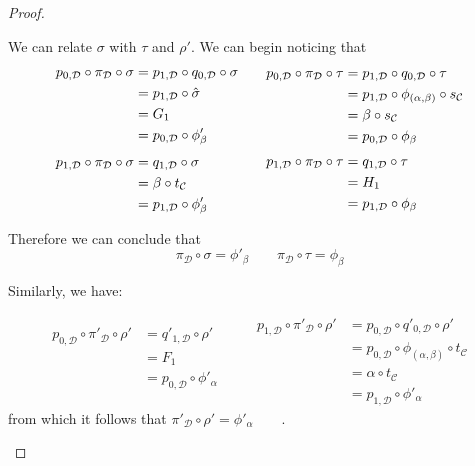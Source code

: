 \documentclass[a4paper,UKenglish,cleveref,pdftex,thm-restate,numberwithinsect]{lipics-v2021}
\begin{document}
\begin{proof}
\begin{enumerate}
We can relate $\sigma$ with $\tau$ and $\rho'$. We can begin noticing that
\[\begin{split}
	p_{0, \mathcal{D}}\circ \pi_{\mathcal{D}}\circ \sigma &= p_{1, \mathcal{D}}\circ q_{0, \mathcal{D}}\circ \sigma \\&=p_{1, \mathcal{D}} \circ \hat{\sigma}\\&=G_1	\\&=p_{0, \mathcal{D}}\circ  \phi'_{\beta} \\[.2\baselineskip] p_{1, \mathcal{D}}\circ \pi_{\mathcal{D}}\circ \sigma &=  q_{1, \mathcal{D}}\circ \sigma \\&=\beta \circ t_{\mathcal{C}}\\&=p_{1, \mathcal{D}}\circ  \phi'_{\beta} 
\end{split} \qquad\begin{split}
	p_{0, \mathcal{D}}\circ \pi_{\mathcal{D}}\circ \tau &= p_{1, \mathcal{D}}\circ q_{0, \mathcal{D}}\circ \tau \\&=p_{1, \mathcal{D}} \circ \phi_{(\alpha, \beta)} \circ s_{\mathcal{C}}\\&=\beta	\circ s_{\mathcal{C}} \\&=p_{0, \mathcal{D}} \circ \phi_{\beta}  \\[.2\baselineskip] 	p_{1, \mathcal{D}}\circ \pi_{\mathcal{D}}\circ \tau &=  q_{1, \mathcal{D}}\circ \tau \\&=H_1 \\&=p_{1, \mathcal{D}} \circ \phi_{\beta}
\end{split} \] 

Therefore we can conclude that
\[\pi_{\mathcal{D}}\circ \sigma = \phi'_\beta \qquad \pi_{\mathcal{D}}\circ \tau = \phi_\beta \]


Similarly, we have:

\[\begin{split}
	p_{0, \mathcal{D}}\circ \pi'_{\mathcal{D}}\circ \rho' &= q'_{1, \mathcal{D}}\circ \rho' \\&=F_1\\&=p_{0, \mathcal{D}}\circ  \phi'_{\alpha} \\ & \end{split} \qquad\begin{split}
	p_{1, \mathcal{D}}\circ \pi'_{\mathcal{D}}\circ \rho' &=  p_{0, \mathcal{D}}\circ q'_{0, \mathcal{D}} \circ  \rho' \\&=p_{0, \mathcal{D}}\circ \phi_{(\alpha, \beta)} \circ t_{\mathcal{C}}\\&=\alpha \circ t_{\mathcal{C}}\\&=p_{1, \mathcal{D}}\circ \phi'_\alpha\end{split} \] 
from which it follows that $\pi'_{\mathcal{D}}\circ \rho' =\phi'_\alpha \qquad$.


\end{enumerate}
\end{proof}
\end{document}
